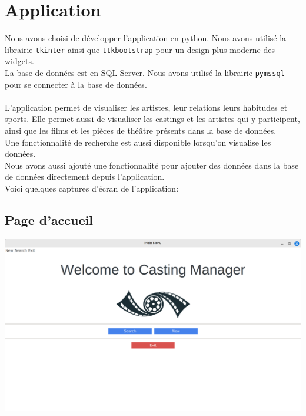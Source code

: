 \documentclass{article}
\newcommand{\n}{\\ [6pt]}
\begin{document}
\newpage
\section{Application}
Nous avons choisi de développer l'application en python. Nous avons
utilisé la librairie \texttt{tkinter} ainsi que \texttt{ttkbootstrap}
pour un design plus moderne des widgets.\n
La base de données est en SQL Server. Nous avons utilisé la librairie
\texttt{pymssql} pour se connecter à la base de données.\n\n
L'application permet de visualiser les artistes, leur relations
leurs habitudes et sports. Elle permet aussi de visualiser les
castings et les artistes qui y participent, ainsi que les films et les
pièces de théâtre présents dans la base de données.\n
Une fonctionnalité de recherche est aussi disponible lorsqu'on
visualise les données.\n
Nous avons aussi ajouté une fonctionnalité pour ajouter des données
dans la base de données directement depuis l'application.\n
Voici quelques captures d'écran de l'application:

\subsection{Page d'accueil}
\begin{center}
  \includegraphics[scale=0.16]{home.png}
\end{center}
\end{document}
